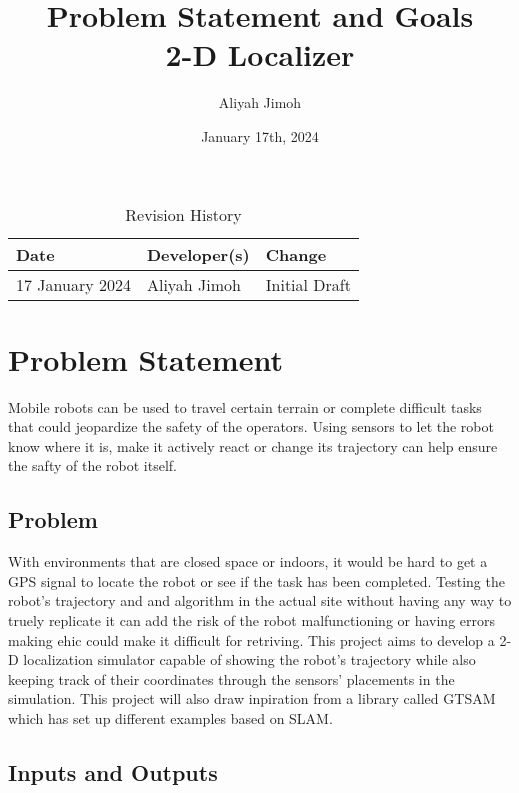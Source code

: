 \documentclass{article}
\title{Problem Statement and Goals\\2-D Localizer}
\author{Aliyah Jimoh}
\date{January 17th, 2024}
\begin{document}
\maketitle

\begin{table}[hp]
\caption{Revision History} \label{TblRevisionHistory}
\begin{tabularx}{\textwidth}{llX}
\toprule
\textbf{Date} & \textbf{Developer(s)} & \textbf{Change}\\
\midrule
17 January 2024 & Aliyah Jimoh & Initial Draft\\
\bottomrule
\end{tabularx}
\end{table}

\section{Problem Statement}
Mobile robots can be used to travel certain terrain or complete difficult tasks that could jeopardize the safety of the operators. Using sensors to let the robot know where it is, make it actively react or change its trajectory can help ensure the safty of the robot itself.
\subsection{Problem}
With environments that are closed space or indoors, it would be hard to get a GPS signal to locate the robot or see if the task has been completed. Testing the robot's trajectory and and algorithm in the actual site without having any way to truely replicate it can add the risk of the robot malfunctioning or having errors making ehic could make it difficult for retriving. This project aims to develop a 2-D localization simulator capable of showing the robot's trajectory while also keeping track of their coordinates through the sensors' placements in the simulation. 
This project will also draw inpiration from a library called GTSAM which has set up different examples based on SLAM.

\subsection{Inputs and Outputs}

\end{document}
